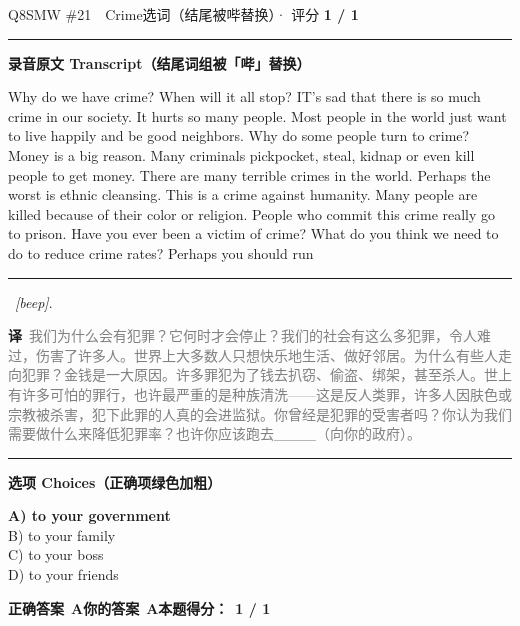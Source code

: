 \documentclass[11pt]{article}
\newcommand{\ptesub}[1]{%
  \par\needspace{2\baselineskip}\smallskip
  {\color{cAccent}\rule[-0.2ex]{3pt}{1.05em}}\hspace{6pt}%
  {\bfseries\color{cHead}#1}\par\nopagebreak\smallskip}
\newcommand{\zh}[1]{{\footnotesize\textcolor{cNote}{\textbf{译}}\ \textcolor{gray}{#1}}}
\begin{document}
\begin{qblock}{Q8\quad SMW \#21\ \ Crime}{选词（结尾被哔替换）· 评分 \textcolor{cAccent}{\bfseries 1 / 1}}
\ptesub{录音原文 Transcript（结尾词组被「哔」替换）}
\begin{promptbox}
Why do we have crime? When will it all stop? IT's sad that there is so much crime in our society. It hurts so many people. Most people in the world just want to live happily and be good neighbors. Why do some people turn to crime? Money is a big reason. Many criminals pickpocket, steal, kidnap or even kill people to get money. There are many terrible crimes in the world. Perhaps the worst is ethnic cleansing. This is a crime against humanity. Many people are killed because of their color or religion. People who commit this crime really go to prison. Have you ever been a victim of crime? What do you think we need to do to reduce crime rates? Perhaps you should run \rule[0.3ex]{1.2cm}{0.4pt}\ \textit{[beep]}.
\end{promptbox}
\zh{我们为什么会有犯罪？它何时才会停止？我们的社会有这么多犯罪，令人难过，伤害了许多人。世界上大多数人只想快乐地生活、做好邻居。为什么有些人走向犯罪？金钱是一大原因。许多罪犯为了钱去扒窃、偷盗、绑架，甚至杀人。世上有许多可怕的罪行，也许最严重的是种族清洗——这是反人类罪，许多人因肤色或宗教被杀害，犯下此罪的人真的会进监狱。你曾经是犯罪的受害者吗？你认为我们需要做什么来降低犯罪率？也许你应该跑去＿＿＿（向你的政府）。}
\ptesub{选项 Choices（正确项绿色加粗）}
{\small
{\color{cFix}\textbf{A) to your government}}\\
B) to your family\\
C) to your boss\\
D) to your friends}
\par\smallskip
\textbf{正确答案}\ \textcolor{cFix}{\bfseries A}\qquad\textbf{你的答案}\ \textcolor{cFix}{\bfseries A}\qquad\textbf{本题得分：}\ {\color{cAccent}\bfseries 1 / 1}
\end{qblock}
\end{document}
